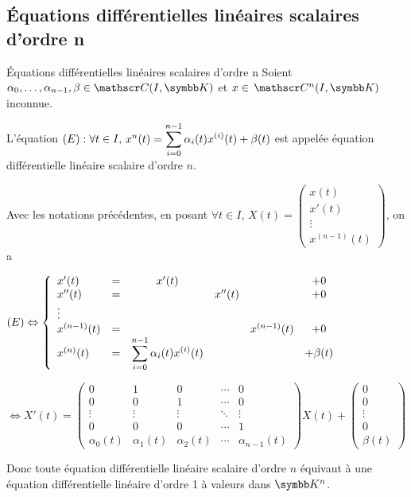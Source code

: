 \subsection{\'Equations différentielles linéaires scalaires d'ordre n}

\begin{definition}{\'Equations différentielles linéaires scalaires d'ordre n}{}
    Soient $\alpha_0, \dots, \alpha_{n-1}, \beta \in \mathscr C(I, \K)$ et 
    $x \in \mc{n} (I, \K)$ inconnue. 

    L'équation $(E) : \forall t \in I, \, x^n(t) = \displaystyle \sum_{i = 0}^{n - 1} \alpha_i(t) x^{(i)}(t) + \beta(t)$ est 
    appelée équation différentielle linéaire scalaire d'ordre $n$.
\end{definition}

\begin{proposition}{}{}
    Avec les notations précédentes, en posant $\forall t \in I$, 
    $X(t) = \begin{pmatrix}
        x(t) \\ x'(t) \\ \vdots \\ x^{(n-1)}(t)
    \end{pmatrix}$, on a 

    $(E) \Leftrightarrow \left\{ \begin{array}{lccccc}
        x'(t) & = & x'(t) & & & + 0 \\
        x''(t) & = & & x''(t) & & + 0 \\
        \vdots & & & & & \\
        x^{(n-1)}(t) & = &  & & x^{(n-1)}(t) & + 0 \\
        x^{(n)}(t) & = & \displaystyle \sum_{i = 0}^{n - 1} \alpha_i(t) x^{(i)}(t) & & & + \beta(t) 
    \end{array} \right.$

    $\Leftrightarrow X'(t) = \begin{pmatrix}
        0 & 1 & 0 & \cdots & 0 \\
        0 & 0 & 1 & \cdots & 0 \\
        \vdots & \vdots & \vdots & \ddots & \vdots \\
        0 & 0 & 0 & \cdots & 1 \\
        \alpha_0(t) & \alpha_1(t) & \alpha_2(t) & \cdots & \alpha_{n-1}(t)
     \end{pmatrix} X(t) + \begin{pmatrix}
        0 \\ 0 \\ \vdots \\ 0 \\ \beta(t)
    \end{pmatrix}$

    \svspace Donc toute équation différentielle linéaire scalaire d'ordre $n$ équivaut à une équation différentielle 
    linéaire d'ordre 1 à valeurs dans $\K^n$.
\end{proposition}

